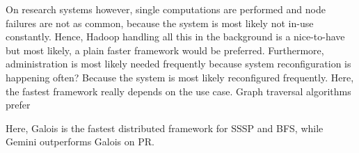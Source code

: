 On research systems however, single computations are performed and node failures are not as common, because the system is most likely not in-use constantly.
Hence, Hadoop handling all this in the background is a nice-to-have but most likely, a plain faster framework would be preferred.
Furthermore, administration is most likely needed frequently because system reconfiguration is happening often?
Because the system is most likely reconfigured frequently.
Here, the fastest framework really depends on the use case. Graph traversal algorithms prefer

Here, Galois is the fastest distributed framework for SSSP and BFS, while Gemini outperforms Galois on PR.












